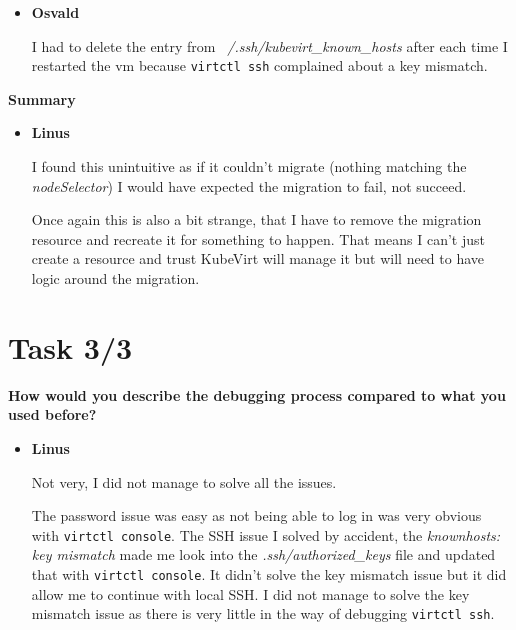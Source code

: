 \documentclass{kththesis}
\begin{document}
\begin{enumerate}
\begin{itemize}
Had I read the documentation I would at least have known that the migration decided to do nothing when I used a non-existent \textit{nodeSelector}.

Once again the documentation deals a lot with how to operate the migration infrastructure and not anything on how one would do a migration operation. Granted it is listed under the \textit{Operations} section of the documentation but I found nothing when searching under the \textit{Virtual Machines} section where I would have expected it to be.

\item \textbf{Osvald}

I had to delete the entry from \textit{~/.ssh/kubevirt\_known\_hosts} after each time I restarted the \Gls{vm} because \texttt{virtctl ssh} complained about a key mismatch.

\end{itemize}

\noindent \textbf{Summary}
\begin{itemize}
\item \textbf{Linus}

I found this unintuitive as if it couldn't migrate (nothing matching the \textit{nodeSelector}) I would have expected the migration to fail, not succeed.

Once again this is also a bit strange, that I have to remove the migration resource and recreate it for something to happen. That means I can't just create a resource and trust KubeVirt will manage it but will need to have logic around the migration.

\end{itemize}

\section{Task 3/3}
\noindent \textbf{How would you describe the debugging process compared to what you used before?}
\begin{itemize}
\item \textbf{Linus}

Not very, I did not manage to solve all the issues.

The password issue was easy as not being able to log in was very obvious with \texttt{virtctl console}. The SSH issue I solved by accident, the \textit{knownhosts: key mismatch} made me look into the \textit{.ssh/authorized\_keys} file and updated that with \texttt{virtctl console}. It didn't solve the key mismatch issue but it did allow me to continue with local SSH. I did not manage to solve the key mismatch issue as there is very little in the way of debugging \texttt{virtctl ssh}.


\end{itemize}
\end{enumerate}
\end{document}
